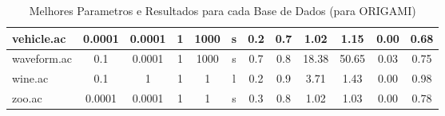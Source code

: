 \begin{table}[htbp]
\begin{tabular}{|l|c|c|c|c|c|c|c||c|c|c|c|}
		\hline
		vehicle.ac     & 0.0001   & 0.0001      & 1              & 1000                & s        & 0.2    & 0.7   & 1.02           & 1.15           & 0.00           & 0.68           \\
		\hline
		waveform.ac    & 0.1      & 0.0001      & 1              & 1000                & s        & 0.7    & 0.8   & 18.38          & 50.65          & 0.03           & 0.75           \\
		\hline
		wine.ac        & 0.1      & 1           & 1              & 1                   & l        & 0.2    & 0.9   & 3.71           & 1.43           & 0.00           & 0.98           \\
		\hline
		zoo.ac         & 0.0001   & 0.0001      & 1              & 1                   & s        & 0.3    & 0.8   & 1.02           & 1.03           & 0.00           & 0.78           \\
		\hline
		\end{tabular}
	\caption{Melhores Parametros e Resultados para cada Base de Dados (para ORIGAMI)}
	\label{tab:best_runs_for_each_db_origami_uc}
\end{table}